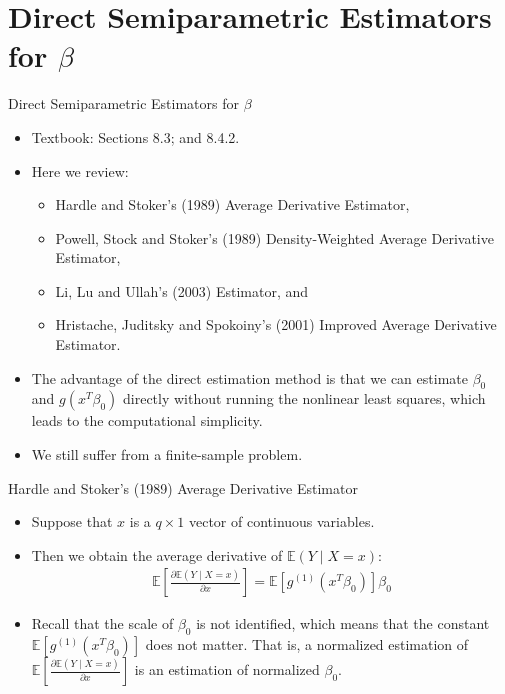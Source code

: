 \documentclass[xcolor=svgnames,dvipdfmx,cjk]{beamer}
\theoremstyle{example}
\def\E{\mathbb{E}}
\begin{document}
\section{Direct Semiparametric Estimators for $\beta$}
  
\begin{frame}{Direct Semiparametric Estimators for $\beta$}
\begin{itemize}
  \item Textbook: Sections 8.3; and 8.4.2.
  \item Here we review:
  \begin{itemize}
    \item Hardle and Stoker's (1989) Average Derivative Estimator, 
    \item Powell, Stock and Stoker's (1989) Density-Weighted Average Derivative Estimator,
    \item Li, Lu and Ullah's (2003) Estimator, and
    \item Hristache, Juditsky and Spokoiny's (2001) Improved Average Derivative Estimator.
  \end{itemize}
  \item The advantage of the direct estimation method is that 
        we can estimate $\beta_0$ and $g(x^T \beta_0)$ directly
        without running the nonlinear least squares, 
        which leads to the computational simplicity.
  \item We still suffer from a finite-sample problem.
\end{itemize}  
\end{frame}

\begin{frame}{Hardle and Stoker's (1989) Average Derivative Estimator}
\begin{itemize}
  \item Suppose that $x$ is a $q \times 1$ vector of continuous variables.
  \item Then we obtain \alert{the average derivative} of $\E(Y \mid X=x)$:
        \begin{align*}
          \E \left[ 
            \frac{\partial \E(Y \mid X=x)}{\partial x}
          \right]
          =
          \E \left[
            g^{(1)}(x^T \beta_0)
          \right]
          \beta_0
        \end{align*}
  \item Recall that the scale of $\beta_0$ is not identified, 
        which means that the constant 
        $\E \left[ g^{(1)}(x^T \beta_0)\right]$ 
        does not matter.
        That is, a normalized estimation of 
        $\E \left[ \frac{\partial \E(Y \mid X=x)}{\partial x}\right]$
        is an estimation of normalized $\beta_0$.
\end{itemize}
\end{frame}
\end{document}
